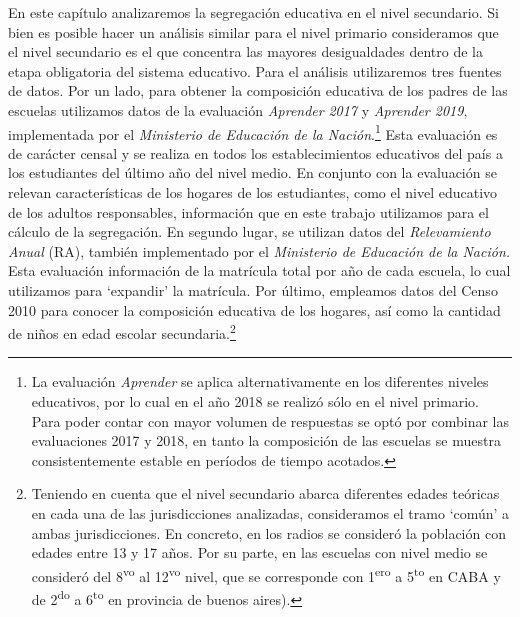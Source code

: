 \documentclass[
  spanish,
  a4paper,%
  chapterprefix=true,%
  DIV=calc,%
  twoside]{scrbook}%
\begin{document}
En este capítulo analizaremos la segregación educativa en el nivel
secundario. Si bien es posible hacer un análisis similar para el nivel
primario consideramos que el nivel secundario es el que concentra las
mayores desigualdades dentro de la etapa obligatoria del sistema
educativo. Para el análisis utilizaremos tres fuentes de datos. Por un
lado, para obtener la composición educativa de los padres de las
escuelas utilizamos datos de la evaluación \emph{Aprender} \emph{2017} y \emph{Aprender
2019}, implementada por el \emph{Ministerio de Educación de la
Nación}.\footnote{La evaluación \emph{Aprender} se aplica
  alternativamente en los diferentes niveles educativos, por lo cual
  en el año 2018 se realizó sólo en el nivel primario. Para poder
  contar con mayor volumen de respuestas se optó por combinar las
  evaluaciones 2017 y 2018, en tanto la composición de las escuelas se
  muestra consistentemente estable en períodos de tiempo acotados.} Esta evaluación es de carácter
censal y se realiza en todos los establecimientos educativos del país a
los estudiantes del último año del nivel medio. En conjunto con la
evaluación se relevan características de los hogares de los estudiantes,
como el nivel educativo de los adultos responsables, información que en
este trabajo utilizamos para el cálculo de la segregación. En segundo
lugar, se utilizan datos del \emph{Relevamiento Anual} (RA), también
implementado por el \emph{Ministerio de Educación de la Nación.} Esta
evaluación información de la matrícula total por año de cada escuela, lo
cual utilizamos para `expandir' la matrícula. Por último, empleamos
datos del Censo 2010 para conocer la composición educativa de los
hogares, así como la cantidad de niños en edad escolar
secundaria.\footnote{Teniendo en cuenta que el nivel secundario
  abarca diferentes edades teóricas en cada una de las jurisdicciones
  analizadas, consideramos el tramo `común' a ambas jurisdicciones. En
  concreto, en los radios se consideró la población con edades entre
  13 y 17 años. Por su parte, en las escuelas con nivel medio se
  consideró del 8\textsuperscript{vo} al 12\textsuperscript{vo} nivel, que se corresponde con 1\textsuperscript{ero} a
  5\textsuperscript{to} en CABA y de 2\textsuperscript{do} a 6\textsuperscript{to} en provincia de buenos aires).}
\end{document}
